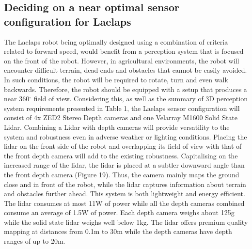 \documentclass{article}
\begin{document}
\begin{enumerate}
\clearpage

\subsection{Deciding on a near optimal sensor configuration for Laelaps}

The Laelaps robot being optimally designed using a combination of criteria related to forward speed, would benefit from a perception system that is focused on the front of the robot. However, in agricultural environments, the robot will encounter difficult terrain, dead-ends and obstacles that cannot be easily avoided. In such conditions, the robot will be required to rotate, turn and even walk backwards. Therefore, the robot should be equipped with a setup that produces a near 360$^{\circ}$ field of view. Considering this, as well as the summary of 3D perception system requirements presented in Table 1, the Laelaps sensor configuration will consist of 4x ZED2 Stereo Depth cameras and one  Velarray M1600 Solid State Lidar. Combining a Lidar with depth cameras will provide versatility to the system and robustness even in adverse weather or lighting conditions. Placing the lidar on the front side of the robot and overlapping its field of view with that of the front depth camera will add to the existing robustness. Capitalising on the increased range of the lidar, the lidar is placed at a subtler downward angle than the front depth camera (Figure 19). Thus, the camera mainly maps the ground close and in front of the robot, while the lidar captures information about terrain and obstacles further ahead. This system is both lightweight and energy efficient. The lidar consumes at most 11W of power while all the depth cameras combined consume an average of 1.5W of power. Each depth camera weighs about 125g while the solid state lidar weighs well below 1kg. The lidar offers premium quality mapping at distances from 0.1m to 30m while the depth cameras have depth ranges of up to 20m. 



\end{enumerate}
\end{document}
